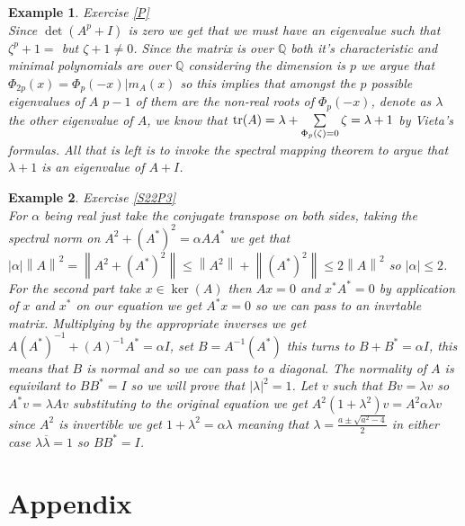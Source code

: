 \documentclass[12pt]{article}
\newcommand{\norm}[1]{\left\lVert #1 \right\rVert}
\theoremstyle{breakplain}
\theoremstyle{breakdef}
\newtheorem*{example}{Example}
\theoremstyle{remark}
\begin{document}
\begin{example}Exercise \ref{P}\\
    Since $\det(A^p+I)$ is zero we get that we must have an eigenvalue such that $\zeta^p+1=$ but $\zeta+1\neq 0$. Since the matrix is over $\mathbb{Q}$
     both it's characteristic and minimal polynomials are over $\mathbb{Q}$ considering the dimension is $p$ we argue that $\Phi_{2p}(x)=\Phi_p(-x)| m_A(x)$ so this implies that amongst the $p$ possible eigenvalues of $A$
      $p-1$ of them are the non-real roots of $\Phi_p(-x)$, denote as $\lambda$ the other eigenvalue of $A$, we know that $\tr(A)=\lambda + \sum\limits_{\Phi_p(\zeta)=0} \zeta=\lambda+1$ by Vieta's formulas. All that is left is to invoke the spectral 
      mapping theorem to argue that $\lambda + 1$ is an eigenvalue of $A+I$.
\end{example}
\begin{example}Exercise \ref{S22P3}\\
    For $\alpha$ being real just take the conjugate transpose on both sides,
    taking the spectral norm on $A^2+(A^*)^2=\alpha AA^*$ we get that $|\alpha|\norm{A}^2=\norm{A^2+(A^*)^2}\leq \norm{A^2}+\norm{(A^*)^2}\leq 2\norm{A}^2 $ so $|\alpha|\leq 2$. For the second part take $x\in \ker(A)$ then $Ax=0$ and $x^*A^*=0$ by application of $x$ and $x^*$ on our equation we get 
    $A^*x=0$ so we can pass to an invrtable matrix. Multiplying by the appropriate inverses we get $A(A^*)^{-1}+(A)^{-1}A^*=\alpha I$, set $B= A^{-1}(A^*)$ this turns to $B+B^*=\alpha I$, this means that $B$ is normal and so we can pass to a diagonal.
    The normality of $A$ is equivilant to $BB^*=I$ so we will prove that $|\lambda|^2=1$. Let $v$ such that $Bv=\lambda v$ so $A^*v=\lambda Av$ substituting to the original equation we get $A^2(1+\lambda^2)v=A^2\alpha \lambda v$ since $A^2$ is invertible we get $1+\lambda^2= \alpha \lambda$ meaning that $\lambda=\frac{a\pm \sqrt{a^2-4}}{2}$ in either case $\lambda \overline{\lambda}=1$ so $BB^*=I$.
\end{example}
\newpage

\section{Appendix}
\end{document}
